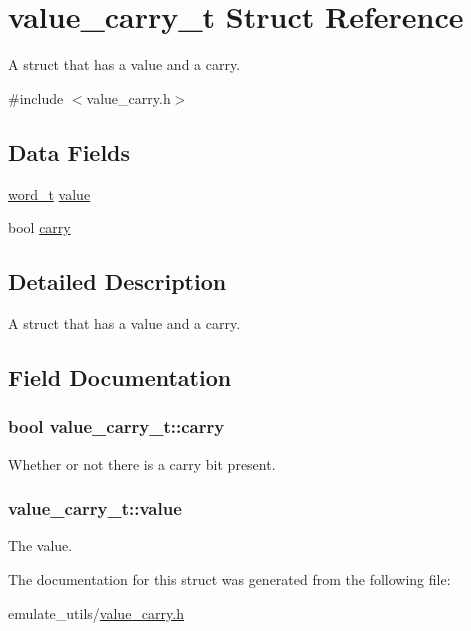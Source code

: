 \hypertarget{structvalue__carry__t}{}\section{value\+\_\+carry\+\_\+t Struct Reference}
\label{structvalue__carry__t}


A struct that has a value and a carry.  




{\ttfamily \#include $<$value\+\_\+carry.\+h$>$}

\subsection*{Data Fields}
\begin{DoxyCompactItemize}
\item 
\hyperlink{global_8h_a0e7744482eed560726581dae7d3cb8b2}{word\+\_\+t} \hyperlink{structvalue__carry__t_a4ee942fb80f5e029be0e70fb36fbe7d2}{value}
\item 
bool \hyperlink{structvalue__carry__t_acc16f68935549d72338a641a70b7a002}{carry}
\end{DoxyCompactItemize}


\subsection{Detailed Description}
A struct that has a value and a carry. 

\subsection{Field Documentation}
\subsubsection[{\texorpdfstring{carry}{carry}}]{\setlength{\rightskip}{0pt plus 5cm}bool value\+\_\+carry\+\_\+t\+::carry}\hypertarget{structvalue__carry__t_acc16f68935549d72338a641a70b7a002}{}\label{structvalue__carry__t_acc16f68935549d72338a641a70b7a002}
Whether or not there is a carry bit present. 
\subsubsection[{\texorpdfstring{value}{value}}]{ value\+\_\+carry\+\_\+t\+::value}\hypertarget{structvalue__carry__t_a4ee942fb80f5e029be0e70fb36fbe7d2}{}\label{structvalue__carry__t_a4ee942fb80f5e029be0e70fb36fbe7d2}
The value. 

The documentation for this struct was generated from the following file\+:\begin{DoxyCompactItemize}
\item 
emulate\+\_\+utils/\hyperlink{value__carry_8h}{value\+\_\+carry.\+h}\end{DoxyCompactItemize}
